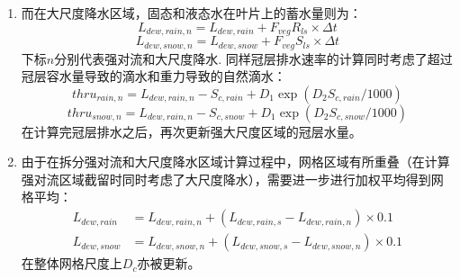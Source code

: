 \begin{enumerate}
\item 而在大尺度降水区域，固态和液态水在叶片上的蓄水量则为：
\begin{equation}
L_{dew,rain,n}=L_{dew,rain}+F_{veg}R_{ls}\times \Delta{t}
\end{equation}
\begin{equation}
L_{dew,snow,n}=L_{dew,snow}+F_{veg}S_{ls} \times \Delta{t}
\end{equation}
下标$n$分别代表强对流和大尺度降水.
同样冠层排水速率的计算同时考虑了超过冠层容水量导致的滴水和重力导致的自然滴水：
\begin{equation}
thru_{rain,n}=L_{dew,rain,n}-S_{c,rain}+D_{1} \exp \left(D_{2} S_{c,rain}/1000\right)
\end{equation}
\begin{equation}
thru_{snow,n}=L_{dew,rain,n}-S_{c,snow}+D_{1} \exp \left(D_{2} S_{c,snow}/1000\right)
\end{equation}
在计算完冠层排水之后，再次更新强大尺度区域的冠层水量。

\item 由于在拆分强对流和大尺度降水区域计算过程中，网格区域有所重叠（在计算强对流区域截留时同时考虑了大尺度降水），需要进一步进行加权平均得到网格平均：
%
\begin{equation}
\begin{aligned}
L_{dew,rain} & = L_{dew,rain,n} + (L_{dew,rain,s} - L_{dew,rain,n}) \times 0.1 \\
L_{dew,snow} & = L_{dew,snow,n} + (L_{dew,snow,s} - L_{dew,snow,n}) \times 0.1
%
\end{aligned}
\end{equation}
%
在整体网格尺度上$D_c$亦被更新。

\end{enumerate}

